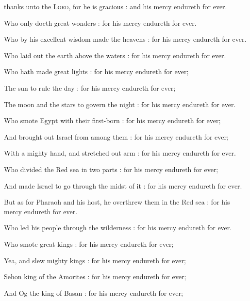 

 thanks unto the \textsc{Lord}, for he is gracious : and his mercy endureth for ever.\par
{}
Who only doeth great wonders : for his mercy endureth for ever.\par
{}Who by his excellent wisdom made the heavens : for his mercy endureth for ever.\par
{}Who laid out the earth above the waters : for his mercy endureth for ever.\par
{}Who hath made great lights : for his mercy endureth for ever;\par
{}The sun to rule the day : for his mercy endureth for ever;\par
{}The moon and the stars to govern the night : for his mercy endureth for ever.\par
{}Who smote Egypt with their first-born : for his mercy endureth for ever;\par
{}And brought out Israel from among them : for his mercy endureth for ever;\par
{}With a mighty hand, and stretched out arm : for his mercy endureth for ever.\par
{}Who divided the Red sea in two parts : for his mercy endureth for ever;\par
{}And made Israel to go through the midst of it : for his mercy endureth for ever.\par
{}But as for Pharaoh and his host, he overthrew them in the Red sea : for his mercy endureth for ever.\par
{}Who led his people through the wilderness : for his mercy endureth for ever.\par
{}Who smote great kings : for his mercy endureth for ever;\par
{}Yea, and slew mighty kings : for his mercy endureth for ever;\par
{}Sehon king of the Amorites : for his mercy endureth for ever;\par
{}And Og the king of Basan : for his mercy endureth for ever;\par
